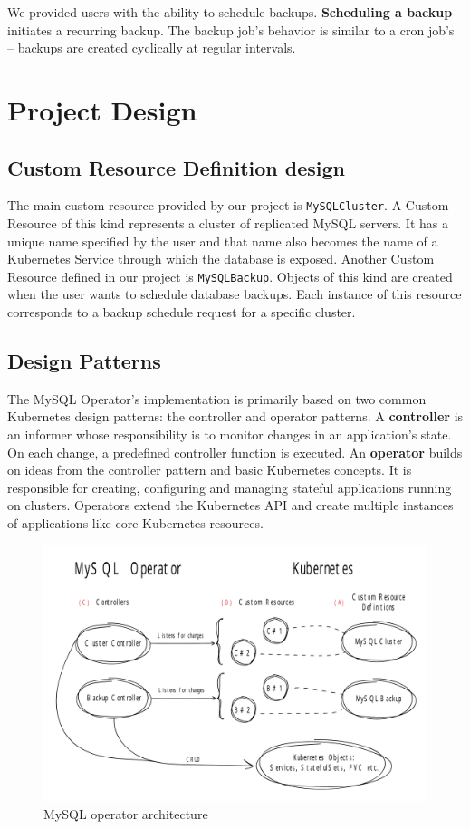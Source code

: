 We provided users with the ability to schedule backups. \textbf{Scheduling a backup} initiates a
recurring backup. The backup job’s behavior is similar to a cron job’s -- backups are created
cyclically at regular intervals.

\section{Project Design}

\subsection{Custom Resource Definition design}
The main custom resource provided by our project is \texttt{MySQLCluster}. A Custom Resource of this kind
represents a cluster of replicated MySQL servers. It has a unique name specified by the user and
that name also becomes the name of a Kubernetes Service through which the database is exposed.
Another Custom Resource defined in our project is \texttt{MySQLBackup}. Objects of this kind are created when
the user wants to schedule database backups. Each instance of this resource corresponds to a backup
schedule request for a specific cluster.

\subsection{Design Patterns}
The MySQL Operator’s implementation is primarily based on two common Kubernetes design patterns:
the controller and operator patterns. A \textbf{controller} is an informer whose responsibility is
to monitor changes in an application’s state. On each change, a predefined controller function is
executed. An \textbf{operator} builds on ideas from the controller pattern and basic Kubernetes
concepts. It is responsible for creating, configuring and managing stateful applications running on
clusters. Operators extend the Kubernetes API and create multiple instances of applications like
core Kubernetes resources.

\begin{figure}[!ht]
    \centering
    \includegraphics[width=1\textwidth, angle=0]{img/Design.pdf}
    \caption{MySQL operator architecture}
    \label{fig:design}
\end{figure}


